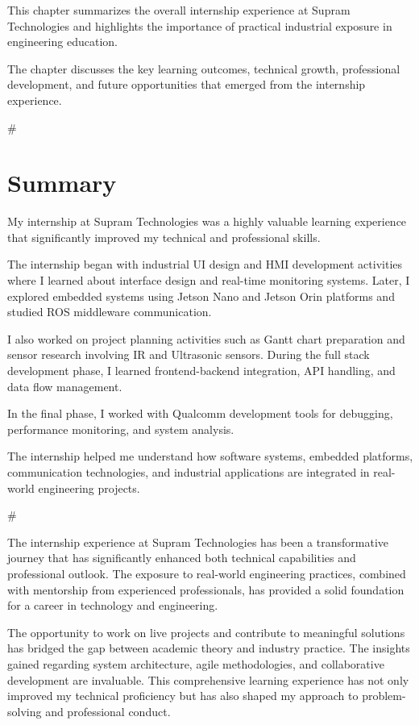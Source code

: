 \documentclass[12pt,a4paper]{report}
\begin{document}
This chapter summarizes the overall internship experience at Supram Technologies and highlights the importance of practical industrial exposure in engineering education.


The chapter discusses the key learning outcomes, technical growth, professional development, and future opportunities that emerged from the internship experience.


\#




\section{Summary}

My internship at Supram Technologies was a highly valuable learning experience that significantly improved my technical and professional skills.


The internship began with industrial UI design and HMI development activities where I learned about interface design and real-time monitoring systems. Later, I explored embedded systems using Jetson Nano and Jetson Orin platforms and studied ROS middleware communication.


I also worked on project planning activities such as Gantt chart preparation and sensor research involving IR and Ultrasonic sensors. During the full stack development phase, I learned frontend-backend integration, API handling, and data flow management.


In the final phase, I worked with Qualcomm development tools for debugging, performance monitoring, and system analysis.


The internship helped me understand how software systems, embedded platforms, communication technologies, and industrial applications are integrated in real-world engineering projects.


\#


The internship experience at Supram Technologies has been a transformative journey that has significantly enhanced both technical capabilities and professional outlook. The exposure to real-world engineering practices, combined with mentorship from experienced professionals, has provided a solid foundation for a career in technology and engineering.


The opportunity to work on live projects and contribute to meaningful solutions has bridged the gap between academic theory and industry practice. The insights gained regarding system architecture, agile methodologies, and collaborative development are invaluable. This comprehensive learning experience has not only improved my technical proficiency but has also shaped my approach to problem-solving and professional conduct.
\end{document}
